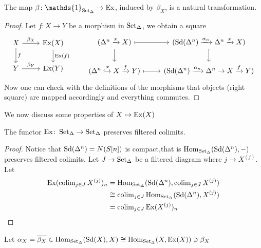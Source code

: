 \begin{lem}
    The map $\beta \colon \mathds{1}_{\SetD} \to \Ex$, induced by $\beta_X$, is a natural transformation.   
\end{lem}

\begin{proof}
    Let $f\colon X \to Y$ be a morphism in $\operatorname{Set}_{\Delta}$, we obtain a square 
    \[
    \begin{tikzcd}
        X 
        \ar[d, "f"]
        \ar[r, "\beta_X"]
        &
        \Ex(X)
        \ar[d, "\Ex(f)"]
        \\
        Y 
        \ar[r, "\beta_Y"]
        &
        \Ex(Y)
    \end{tikzcd}
    \qquad
    \begin{tikzcd}
        (\Delta^n \xrightarrow{x} X)
        \ar[d]
        \ar[r, mapsto]
        &
        (\Sd(\Delta^n)\xrightarrow{\alpha_n}\Delta^n\xrightarrow{x}X)
        \ar[d, mapsto]
        \\
        (\Delta^n \xhookrightarrow{x} X \xrightarrow{f} Y)
        \ar[r, mapsto]
        &
        (\Sd(\Delta^n) \xrightarrow{\alpha_n} \Delta^n \to X \xrightarrow{f} Y)
    \end{tikzcd}
    \]
    Now one can check with the definitions of the morphisms that objects (right square) are mapped accordingly and everything commutes.
\end{proof}

We now discuss some properties of $X \mapsto \operatorname{Ex}(X)$

\begin{prop}
    The functor $\operatorname{Ex}\colon \operatorname{Set}_{\Delta} \to \operatorname{Set}_{\Delta}$ preserves filtered colimits.
\end{prop}

\begin{proof}
    Notice that $\operatorname{Sd}(\Delta^n)=N(S[n])$ is compact,that is $\operatorname{Hom}_{\operatorname{Set}_{\Delta}}(\operatorname{Sd}(\Delta^n),-)$ preserves filtered colimits.
    Let $J \to \operatorname{Set}_{\Delta}$ be a filtered diagram where $j \to X^{(j)}$.
    Let 
    \begin{align*}
        \operatorname{Ex}(\operatorname{colim}_{j\in J} X^{(j)})_n &= \operatorname{Hom}_{\operatorname{Set}_{\Delta}}(\operatorname{Sd}(\Delta^n), \operatorname{colim}_{j \in J} X^{(j)}) \\
        &\cong \operatorname{colim}_{j \in J}\operatorname{Hom}_{\operatorname{Set}_{\Delta}}(\operatorname{Sd}(\Delta^n), X^{(j)}) \\
        &= \operatorname{colim}_{j \in J} \operatorname{Ex}(X^{(j)})_n
    \end{align*}
\end{proof}

\begin{rmk}
    Let $\alpha_X = \overline{\beta_X} \in \operatorname{Hom}_{\operatorname{Set}_{\Delta}}(\operatorname{Sd}(X),X) \cong \operatorname{Hom}_{\operatorname{Set}_{\Delta}}(X, \operatorname{Ex}(X)) \ni \beta_X$
\end{rmk}


